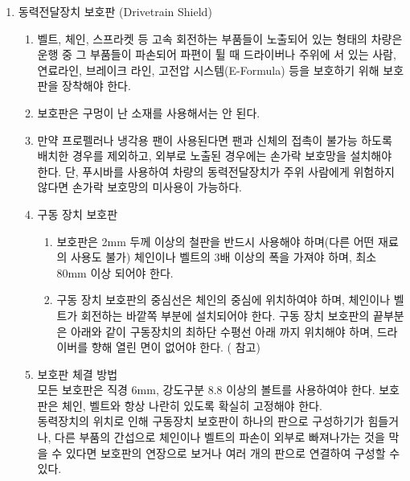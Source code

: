 \documentclass[final,a4paper,10pt]{report}
\begin{document}
\begin{enumerate}
  \item\label{rule:formula-technical.powertrain.drivetrain-shield} 동력전달장치 보호판 (Drivetrain Shield)
    \begin{enumerate}
      \item\label{rule:formula-technical.powertrain.drivetrain-shield.required-for-exposed-parts} 벨트, 체인, 스프라켓 등 고속 회전하는 부품들이 노출되어 있는 형태의 차량은 운행 중 그 부품들이 파손되어 파편이 튈 때 드라이버나 주위에 서 있는 사람, 연료라인, 브레이크 라인, 고전압 시스템(E-Formula) 등을 보호하기 위해 보호판을 장착해야 한다.
      \item\label{rule:formula-technical.powertrain.drivetrain-shield.no-perforated-material} 보호판은 구멍이 난 소재를 사용해서는 안 된다.
      \item\label{rule:formula-technical.powertrain.drivetrain-shield.fan-finger-guard} 만약 프로펠러나 냉각용 팬이 사용된다면 팬과 신체의 접촉이 불가능 하도록 배치한 경우를 제외하고, 외부로 노출된 경우에는 손가락 보호망을 설치해야 한다. 단, 푸시바를 사용하여 차량의 동력전달장치가 주위 사람에게 위험하지 않다면 손가락 보호망의 미사용이 가능하다.

      \item\label{rule:formula-technical.powertrain.drivetrain-shield.shield-construction} 구동 장치 보호판
        \begin{enumerate}
          \item\label{rule:formula-technical.powertrain.drivetrain-shield.shield-construction.material-thickness-and-width} 보호판은 2mm 두께 이상의 철판을 반드시 사용해야 하며(다른 어떤 재료의 사용도 불가) 체인이나 벨트의 3배 이상의 폭을 가져야 하며, 최소 80mm 이상 되어야 한다.
          \item\label{rule:formula-technical.powertrain.drivetrain-shield.shield-construction.position-and-coverage} 구동 장치 보호판의 중심선은 체인의 중심에 위치하여야 하며, 체인이나 벨트가 회전하는 바깥쪽 부분에 설치되어야 한다. 구동 장치 보호판의 끝부분은 아래와 같이 구동장치의 최하단 수평선 아래 까지 위치해야 하며, 드라이버를 향해 열린 면이 없어야 한다. ( 참고)
        \end{enumerate}
      \item\label{rule:formula-technical.powertrain.drivetrain-shield.bolted-fastening-method} 보호판 체결 방법\\
        모든 보호판은 직경 6mm, 강도구분 8.8 이상의 볼트를 사용하여야 한다. 보호판은 체인, 벨트와 항상 나란히 있도록 확실히 고정해야 한다.\\
        동력장치의 위치로 인해 구동장치 보호판이 하나의 판으로 구성하기가 힘들거나, 다른 부품의 간섭으로 체인이나 벨트의 파손이 외부로 빠져나가는 것을 막을 수 있다면 보호판의 연장으로 보거나 여러 개의 판으로 연결하여 구성할 수 있다.
    \end{enumerate}


\end{enumerate}
\end{document}
